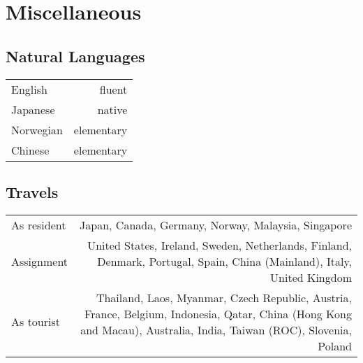 \section*{Miscellaneous}
\subsection*{Natural Languages}
\begin{tabular}{L!{\VRule}R}  
English & fluent \\
Japanese & native \\
Norwegian & elementary \\
Chinese & elementary \\
\end{tabular}

\subsection*{Travels}
\begin{tabular}{L!{\VRule}R}  
As resident & Japan, Canada, Germany, Norway, Malaysia, Singapore \\
Assignment & United States, Ireland, Sweden, Netherlands, Finland,
Denmark, Portugal, Spain, China (Mainland), Italy, United Kingdom \\
As tourist & Thailand, Laos, Myanmar, Czech Republic,
Austria, France, Belgium, Indonesia, Qatar, China (Hong Kong and
Macau), Australia, India, Taiwan (ROC), Slovenia, Poland\\
\end{tabular}